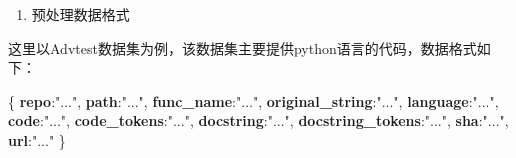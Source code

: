 \documentclass[
]{article}
\newenvironment{Shaded}{}{}
\newcommand{\ErrorTok}[1]{\textcolor[rgb]{1.00,0.00,0.00}{\textbf{#1}}}
\newcommand{\FunctionTok}[1]{\textcolor[rgb]{0.02,0.16,0.49}{#1}}
\newcommand{\StringTok}[1]{\textcolor[rgb]{0.25,0.44,0.63}{#1}}
\begin{document}
\begin{enumerate}
  \def\labelenumi{\arabic{enumi}.}
  \item
        预处理数据格式
\end{enumerate}

这里以Advtest数据集为例，该数据集主要提供python语言的代码，数据格式如下：

\begin{Shaded}
  \begin{Highlighting}[]
    \FunctionTok{\{}
    \ErrorTok{repo}\FunctionTok{:}\StringTok{"..."}\FunctionTok{,}
    \ErrorTok{path}\FunctionTok{:}\StringTok{"..."}\FunctionTok{,}
    \ErrorTok{func\_name}\FunctionTok{:}\StringTok{"..."}\FunctionTok{,}
    \ErrorTok{original\_string}\FunctionTok{:}\StringTok{"..."}\FunctionTok{,}
    \ErrorTok{language}\FunctionTok{:}\StringTok{"..."}\FunctionTok{,}
    \ErrorTok{code}\FunctionTok{:}\StringTok{"..."}\FunctionTok{,}
    \ErrorTok{code\_tokens}\FunctionTok{:}\StringTok{"..."}\FunctionTok{,}
    \ErrorTok{docstring}\FunctionTok{:}\StringTok{"..."}\FunctionTok{,}
    \ErrorTok{docstring\_tokens}\FunctionTok{:}\StringTok{"..."}\FunctionTok{,}
    \ErrorTok{sha}\FunctionTok{:}\StringTok{"..."}\FunctionTok{,}
    \ErrorTok{url}\FunctionTok{:}\StringTok{"..."}
    \FunctionTok{\}}
  \end{Highlighting}
\end{Shaded}
\end{document}
